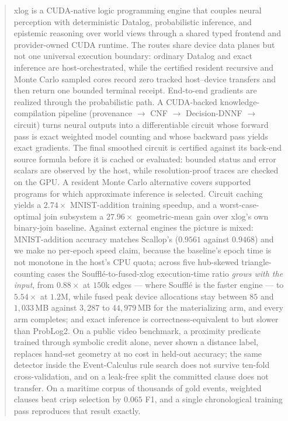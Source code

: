 \begin{abstract}
\noindent
xlog is a CUDA-native logic programming engine that couples neural perception with deterministic Datalog, probabilistic inference, and epistemic reasoning over world views through a shared typed frontend and provider-owned CUDA runtime. The routes share device data planes but not one universal execution boundary: ordinary Datalog and exact inference are host-orchestrated, while the certified resident recursive and Monte Carlo sampled cores record zero tracked host--device transfers and then return one bounded terminal receipt. End-to-end gradients are realized through the probabilistic path. A CUDA-backed knowledge-compilation pipeline (provenance $\to$ CNF $\to$ Decision-DNNF $\to$ circuit) turns neural outputs into a differentiable circuit whose forward pass is exact weighted model counting and whose backward pass yields exact gradients. The final smoothed circuit is certified against its back-end source formula before it is cached or evaluated: bounded status and error scalars are observed by the host, while resolution-proof traces are checked on the GPU. A resident Monte Carlo alternative covers supported programs for which approximate inference is selected. Circuit caching yields a $2.74\times$ MNIST-addition training speedup, and a worst-case-optimal join subsystem a $27.96\times$ geometric-mean gain over xlog's own binary-join baseline. Against external engines the picture is mixed: MNIST-addition accuracy matches Scallop's ($0.9561$ against $0.9468$) and we make no per-epoch speed claim, because the baseline's epoch time is not monotone in the host's CPU quota; across five hub-skewed triangle-counting cases the Soufflé-to-fused-xlog execution-time ratio \emph{grows with the input}, from $0.88\times$ at $150$k edges --- where Soufflé is the faster engine --- to $5.54\times$ at $1.2$M, while fused peak device allocations stay between $85$ and $1{,}033$\,MB against $3{,}287$ to $44{,}979$\,MB for the materializing arm, and every arm completes; and exact inference is correctness-equivalent to but slower than ProbLog2. On a public video benchmark, a proximity predicate trained through symbolic credit alone, never shown a distance label, replaces hand-set geometry at no cost in held-out accuracy; the same detector inside the Event-Calculus rule search does not survive ten-fold cross-validation, and on a leak-free split the committed clause does not transfer. On a maritime corpus of thousands of gold events, weighted clauses beat crisp selection by $0.065$ F1, and a single chronological training pass reproduces that result exactly.
\end{abstract}
